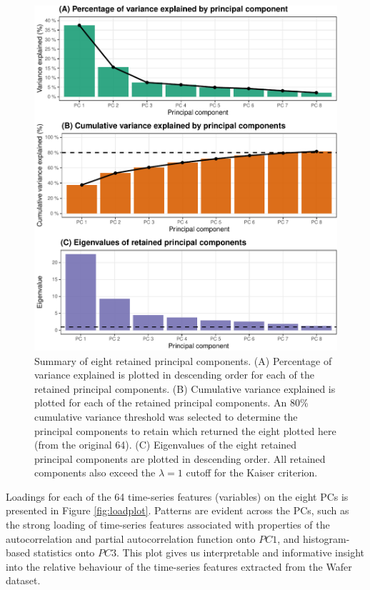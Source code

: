 \documentclass{article}
\begin{document}
\begin{figure}
\centering
\includegraphics{olet5610_report_files/figure-latex/eigenplots-1.pdf}
\caption{\label{fig:eigenplots}Summary of eight retained principal components. (A) Percentage of variance explained is plotted in descending order for each of the retained principal components. (B) Cumulative variance explained is plotted for each of the retained principal components. An 80\% cumulative variance threshold was selected to determine the principal components to retain which returned the eight plotted here (from the original 64). (C) Eigenvalues of the eight retained principal components are plotted in descending order. All retained components also exceed the \(\lambda = 1\) cutoff for the Kaiser criterion.}
\end{figure}

Loadings for each of the 64 time-series features (variables) on the eight PCs is presented in Figure \ref{fig:loadplot}. Patterns are evident across the PCs, such as the strong loading of time-series features associated with properties of the autocorrelation and partial autocorrelation function onto \(PC 1\), and histogram-based statistics onto \(PC 3\). This plot gives us interpretable and informative insight into the relative behaviour of the time-series features extracted from the Wafer dataset.
\end{document}
